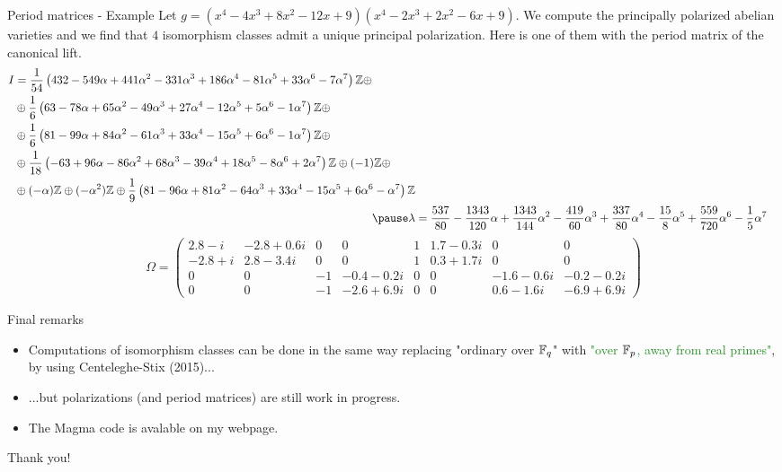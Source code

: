 \documentclass[usenames,dvipsnames]{beamer}
\newcommand{\green}[1]{\textcolor{ForestGreen}{#1}}
\begin{document}
    
\begin{frame}{ Period matrices - Example }
   Let $g=(x^4 - 4x^3 + 8x^2 - 12x + 9)(x^4 - 2x^3 + 2x^2 - 6x + 9)$.
   \pause We compute the principally polarized abelian varieties and we find that $4$ isomorphism classes admit a unique principal polarization.
   \pause Here is one of them with the period matrix of the canonical lift.
 {\scriptsize\begin{align*}
    \begin{split}
       I & =  \dfrac{1}{54}\left(432-549\alpha+441\alpha^2-331\alpha^3+186\alpha^4-81\alpha^5+33\alpha^6-7\alpha^7\right)\Z\oplus\\
	   & \oplus\dfrac{1}{6}\left(63-78\alpha+65\alpha^2-49\alpha^3+27\alpha^4-12\alpha^5+5\alpha^6-1\alpha^7\right)\Z\oplus\\
           & \oplus\dfrac{1}{6}\left(81-99\alpha+84\alpha^2-61\alpha^3+33\alpha^4-15\alpha^5+6\alpha^6-1\alpha^7\right)\Z\oplus\\
           & \oplus\dfrac{1}{18}\left(-63+96\alpha-86\alpha^2+68\alpha^3-39\alpha^4+18\alpha^5-8\alpha^6+2\alpha^7\right)\Z\oplus(-1)\Z\oplus\\
	   & \oplus(-\alpha)\Z\oplus(-\alpha^2)\Z\oplus\dfrac{1}{9}\left(81-96\alpha+81\alpha^2-64\alpha^3+33\alpha^4-15\alpha^5+6\alpha^6-\alpha^7\right)\Z
    \end{split}\\
    \pause \lambda & = \dfrac{537}{80} -\dfrac{1343}{120}\alpha +\dfrac{1343}{144}\alpha^2 -\dfrac{419}{60}\alpha^3 +\dfrac{337}{80}\alpha^4 -\dfrac{15}{8}\alpha^5 +\dfrac{559}{720}\alpha^6 -\dfrac{1}{5}\alpha^7
    \end{align*}}
    \pause
    {\scriptsize\[
    \Omega =
    \begin{pmatrix}
      2.8 - i & -2.8 + 0.6i & 0 & 0 & 1 & 1.7 - 0.3i & 0 & 0 \\
      -2.8 + i & 2.8 - 3.4i & 0 & 0 & 1 & 0.3 + 1.7i & 0 & 0 \\
      0 & 0 & -1 & -0.4 - 0.2i & 0 & 0 & -1.6 - 0.6i & -0.2 - 0.2i\\
      0 & 0 & -1 & -2.6 + 6.9i & 0 & 0 & 0.6 - 1.6i & -6.9 + 6.9i
    \end{pmatrix}
    \]}
\end{frame}

\begin{frame}{ Final remarks }
    \begin{itemize}
     \item Computations of isomorphism classes can be done in the same way replacing "ordinary over $\mathbb{F}_q$" with \green{"over $\mathbb{F}_p$, away from real primes"}, by using Centeleghe-Stix (2015)...
     \item ...but polarizations (and period matrices) are still work in progress.
     \item The Magma code is avalable on my webpage.
    \end{itemize}
\end{frame}

\begin{frame}{ }
\begin{center}
{\Large Thank you!}
\end{center}
\end{frame}
\end{document}
